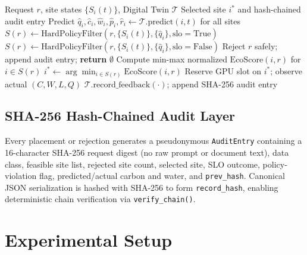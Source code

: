 \documentclass[conference]{IEEEtran}
\begin{document}
\begin{algorithm}[!t]
\caption{EcoTrust-DT Policy-Safe Placement}
\label{alg:ecotrust}
\begin{algorithmic}[1]
\REQUIRE Request $r$, site states $\{S_i(t)\}$, Digital Twin $\mathcal{T}$
\ENSURE Selected site $i^*$ and hash-chained audit entry
\STATE Predict $\hat{q}_i, \hat{c}_i, \hat{w}_i, \hat{p}_i, \hat{r}_i \leftarrow \mathcal{T}.\text{predict}(i, t)$ for all sites
\STATE $S(r) \leftarrow \text{HardPolicyFilter}(r, \{S_i(t)\}, \{\hat{q}_i\}, \text{slo}=\text{True})$
  \STATE $S(r) \leftarrow \text{HardPolicyFilter}(r, \{S_i(t)\}, \{\hat{q}_i\}, \text{slo}=\text{False})$
\ENDIF
{}
  \STATE Reject $r$ safely; append audit entry; \textbf{return} $\emptyset$
\ENDIF
\STATE Compute min-max normalized $\mathrm{EcoScore}(i,r)$ for $i \in S(r)$
\STATE $i^* \leftarrow \arg\min_{i \in S(r)} \mathrm{EcoScore}(i,r)$
\STATE Reserve GPU slot on $i^*$; observe actual $(C, W, L, Q)$
\STATE $\mathcal{T}.\text{record\_feedback}(\cdot)$; append SHA-256 audit entry
\end{algorithmic}
\end{algorithm}

\subsection{SHA-256 Hash-Chained Audit Layer}
Every placement or rejection generates a pseudonymous \texttt{AuditEntry} containing a 16-character SHA-256 request digest (no raw prompt or document text), data class, feasible site list, rejected site count, selected site, SLO outcome, policy-violation flag, predicted/actual carbon and water, and \texttt{prev\_hash}. Canonical JSON serialization is hashed with SHA-256 to form \texttt{record\_hash}, enabling deterministic chain verification via \texttt{verify\_chain()}.

\section{Experimental Setup}
\label{sec:setup}
\end{document}
